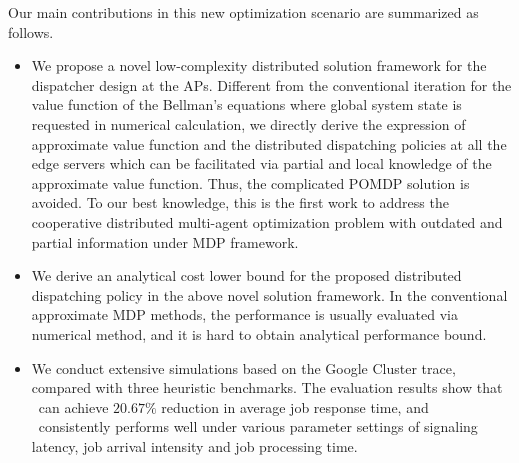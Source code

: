 Our main contributions in this new optimization scenario are summarized as follows.
\begin{itemize}
    \item We propose a novel low-complexity distributed solution framework for the dispatcher design at the APs.
    Different from the conventional iteration for the value function of the Bellman's equations where global system state is requested in numerical calculation,
    we directly derive the expression of approximate value function and the distributed dispatching policies at all the edge servers which can be facilitated via partial and local knowledge of the approximate value function.
    Thus, the complicated POMDP solution is avoided.
    To our best knowledge, this is the first work to address the cooperative distributed multi-agent optimization problem {with outdated and partial information} under MDP framework.
    \item We derive an analytical cost lower bound for the proposed distributed dispatching policy in the above novel solution framework. In the conventional approximate MDP methods, the performance is usually evaluated via numerical method, and it is hard to obtain analytical performance bound. 
    \item We conduct extensive simulations based on the Google Cluster trace, compared with three heuristic benchmarks. The evaluation results show that \algname~can achieve $20.67\%$ reduction in average job response time, and \algname~consistently performs well under various parameter settings of signaling latency, job arrival intensity and job processing time. 
\end{itemize}

